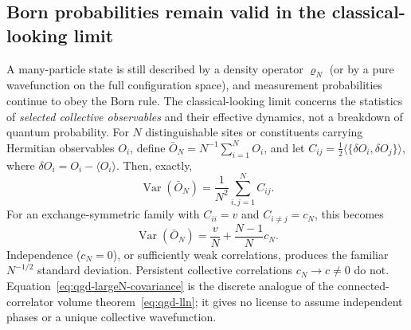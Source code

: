 \documentclass[11pt,a4paper]{article}
\begin{document}
\subsection{Born probabilities remain valid in the classical-looking limit}
\label{subsec:qgd-largeN-born}
A many-particle state is still described by a density operator $\varrho_N$ (or by a pure wavefunction on the full configuration space), and measurement probabilities continue to obey the Born rule. The classical-looking limit concerns the statistics of \emph{selected collective observables} and their effective dynamics, not a breakdown of quantum probability.
For $N$ distinguishable sites or constituents carrying Hermitian observables $O_i$, define $\bar O_N=N^{-1}\sum_{i=1}^N O_i$, and let
$C_{ij}=\tfrac12\langle\{\delta O_i,\delta O_j\}\rangle$, where $\delta O_i=O_i-\langle O_i\rangle$. Then, exactly,
\begin{equation}\label{eq:qgd-largeN-covariance}
\boxed{\operatorname{Var}(\bar O_N)=\frac{1}{N^2}\sum_{i,j=1}^N C_{ij}.}
\end{equation}
For an exchange-symmetric family with $C_{ii}=v$ and $C_{i\neq j}=c_N$, this becomes
\begin{equation}\label{eq:qgd-largeN-covexchange}
\boxed{\operatorname{Var}(\bar O_N)=\frac vN+\frac{N-1}{N}c_N.}
\end{equation}
Independence ($c_N=0$), or sufficiently weak correlations, produces the familiar $N^{-1/2}$ standard deviation. Persistent collective correlations $c_N\to c\ne0$ do not. Equation~\eqref{eq:qgd-largeN-covariance} is the discrete analogue of the connected-correlator volume theorem~\eqref{eq:qgd-lln}; it gives no license to assume independent phases or a unique collective wavefunction.
\end{document}
